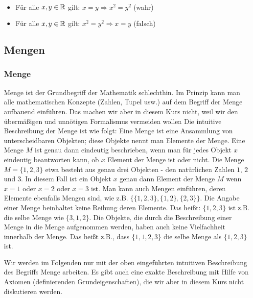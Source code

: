 \begin{bsp}\
	\begin{itemize}
		\item Für alle $ x,y \in \mathbb R$ gilt: $x = y \Rightarrow x^2 = y^2 $ (wahr)
		\item Für alle $ x,y \in \mathbb R$ gilt:  $x^2 = y^2 \Rightarrow x = y $ (falsch)	
	\end{itemize}
\end{bsp}

\clearpage
\subsection{Mengen}

\subsubsection{Menge}

Menge ist der Grundbegriff der Mathematik schlechthin. Im Prinzip kann man alle mathematischen Konzepte (Zahlen, Tupel usw.) auf dem Begriff der Menge aufbauend einführen. Das machen wir aber in diesem Kurs nicht, weil wir den übermäßigen und unnötigen Formalismus vermeiden wollen Die intuitive Beschreibung der Menge ist wie folgt: Eine Menge ist eine Ansammlung von unterscheidbaren Objekten; diese Objekte nennt man Elemente der Menge. Eine Menge $M$ ist genau dann eindeutig beschrieben, wenn man für jedes Objekt $x$ eindeutig beantworten kann, ob $x$ Element der Menge ist oder nicht. Die Menge $M=\{1,2,3\}$ etwa besteht aus genau drei Objekten - den natürlichen Zahlen $1$, $2$ und $3$. In diesem Fall ist ein Objekt $x$ genau dann Element der Menge $M$ wenn $x=1$ oder $x=2$ oder $x=3$ ist. Man kann auch Mengen einführen, deren Elemente ebenfalls Mengen sind, wie z.B. $\{\{1,2,3\},\{1,2\},\{2,3\}\}$. Die Angabe einer Menge beinhaltet keine Reihung deren Elemente. Das heißt: $\{1,2,3\}$ ist z.B. die selbe Menge wie $\{3,1,2\}$. Die Objekte, die durch die Beschreibung einer Menge in die Menge aufgenommen werden, haben auch keine Vielfachheit innerhalb der Menge. Das heißt z.B., dass $\{1,1,2,3\}$ die selbe Menge als $\{1,2,3\}$ ist. 

Wir werden im Folgenden nur mit der oben eingeführten intuitiven Beschreibung des Begriffs Menge arbeiten. Es gibt auch eine exakte Beschreibung mit Hilfe von Axiomen (definierenden Grundeigenschaften), die wir aber in diesem Kurs nicht diskutieren werden. 

